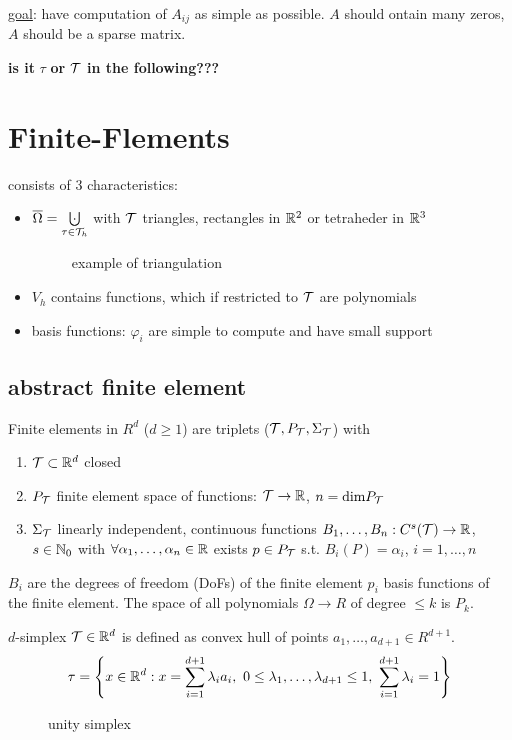\underline{goal}: have computation of $A_{ij}$ as simple as possible. $A$ should ontain many zeros, $A$ should be a sparse matrix.


\textbf{is it }$\tau$ \textbf{ or } $\mathcal{T}$ \textbf{in the following???}
\section{Finite-Flements}
consists of 3 characteristics:
\begin{itemize}
	\item $\overline{\Omega}= \underset{\tau \in \T_h}{\bigcupdot}$ with $\mathcal{T}$ triangles, rectangles in $\mathbb{R}^2$ or tetraheder in $\mathbb{R}^3$
	
\begin{figure}[h!]
\center

\caption{example of triangulation}
\label{AbbExampleTriangulation}
\end{figure}	
	
	\item $V_h$ contains functions, which if restricted to $\mathcal{T}$ are polynomials
	\item basis functions: $\varphi_i$ are simple to compute and have small support
\end{itemize}
\subsection{abstract finite element}
\begin{definition_}
	Finite elements in $R^d$ ($d\geq 1$) are triplets ($\mathcal{T},P_{\mathcal{T}},\Sigma_{\mathcal{T}}$) with 
	\begin{enumerate}[label=(\roman*)]
		\item $\mathcal{T} \subset \mathbb{R}^d$ closed
		\item $P_{\mathcal{T}}$ finite element space of functions: $\mathcal{T} \to \mathbb{R}$, $n = \text{dim}P_{\mathcal{T}}$
		\item $\Sigma_{\mathcal{T}}$ linearly independent, continuous functions $B_1,\dots,B_n:C^s(\mathcal{T}) \to \mathbb{R}$, $s \in \mathbb{N}_0$ with $\forall \alpha_1, \dots, \alpha_n \in \mathbb{R}$ exists $p \in P_{\mathcal{T}}$ s.t. $B_i (P) = \alpha_i$, $i = 1, \dots,n$
	\end{enumerate}
\end{definition_}
$B_i$ are the degrees of freedom (DoFs) of the finite element $p_i$ basis functions of the finite element. The space of all polynomials $\Omega \to R$ of degree $\leq k$ is $P_k$.

$d$-simplex $\mathcal{T} \in \mathbb{R}^d$ is defined as convex hull of points $a_1,\dots,a_{d+1}\in R^{d+1}$.
\begin{equation*}
	\tau = \left\{ x\in \mathbb{R}^d: x= \displaystyle \sum^{d+1}_{i=1} \lambda_ia_i,\ 0 \leq \lambda_1, \dots,\lambda_{d+1}\leq 1,\ \displaystyle \sum^{d+1}_{i=1} \lambda_i =1\right\}
\end{equation*}

\begin{figure}[h!]
\center

\caption{unity simplex}
\label{AbbUnitySimplex}
\end{figure}